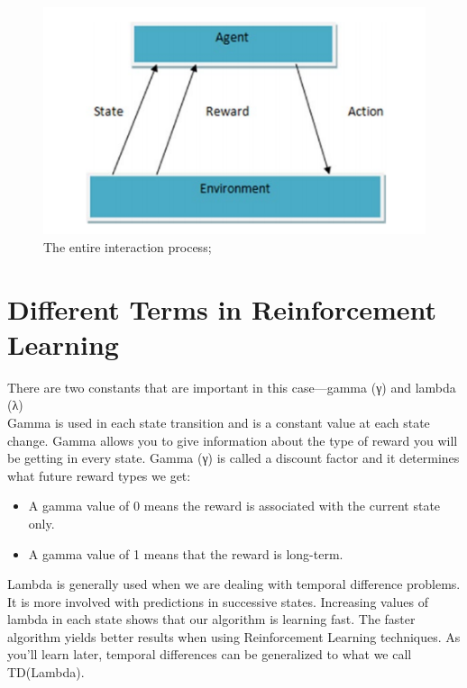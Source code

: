 \documentclass[12pt,a4paper]{article}
\begin{document}
\begin{figure}[hbt!]
\begin{center}
\includegraphics[scale=0.74]{ Scenario of state changes}
\caption{The entire interaction process; }%
\end{center}
\end{figure}
\section{Different Terms in Reinforcement Learning}
There are two constants that are important in this case—gamma (γ) and lambda (λ)\\[10pt]
Gamma is used in each state transition and is a constant value at each state change. 
Gamma allows you to give information about the type of reward you will be getting in 
every state. 
Gamma (γ) is called a discount 
factor and it determines what future reward types we get:\\
\begin{itemize}
\item A gamma value of 0 means the reward is associated with the 
current state only.
\end{itemize}

\begin{itemize}
\item A gamma value of 1 means that the reward is long-term.
\end{itemize}
Lambda is generally used when we are dealing with temporal difference problems. It is 
more involved with predictions in successive states.
Increasing values of lambda in each state shows that our algorithm is learning fast. 
The faster algorithm yields better results when using Reinforcement Learning techniques.
As you’ll learn later, temporal differences can be generalized to what we call 
TD(Lambda).\\
\end{document}

